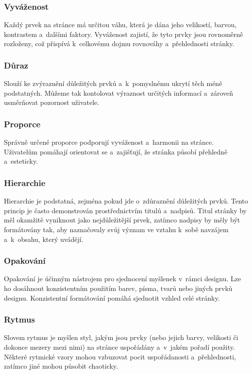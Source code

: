 \subsubsection*{Vyváženost}
Každý prvek na stránce má určitou váhu, která je dána jeho velikostí, barvou, kontrastem a~dalšími faktory. Vyváženost zajistí, že tyto prvky jsou rovnoměrně rozloženy, což přispívá k~celkovému dojmu rovnováhy a~přehlednosti stránky.

\subsubsection*{Důraz}
Slouží ke zvýraznění důležitých prvků a~k~pomyslnému ukrytí těch méně podstatných. Můžeme tak kontolovat výraznost určitých informací a~zároveň usměrňovat pozornost uživatele.

\subsubsection*{Proporce}
Správně určené proporce podporují vyváženost a~harmonii na stránce. Uživatelům pomáhají orientovat se a~zajišťují, že stránka působí přehledně a~esteticky.

\subsubsection*{Hierarchie}
Hierarchie je podstatná, zejména pokud jde o~zdůraznění důležitých prvků. Tento princip je často demonstrován prostřednictvím titulů a~nadpisů. Titul stránky by měl okamžitě vyniknout jako nejdůležitější prvek, zatímco nadpisy by měly být formátovány tak, aby naznačovaly svůj význam ve vztahu k~sobě navzájem a~k~obsahu, který uvádějí.

\subsubsection*{Opakování}
Opakování je účinným nástrojem pro sjednocení myšlenek v~rámci designu. Lze ho dosáhnout konzistentním použitím barev, písma, tvarů nebo jiných prvků designu. Konzistentní formátování pomáhá sjednotit vzhled celé stránky.

\subsubsection*{Rytmus}
Slovem rytmus je myšlen styl, jakým jsou prvky (nebo jejich barvy, velikosti či dokonce mezery mezi nimi) na stránce uspořádány a~v~jakém pořadí použity. Některé rytmické vzory mohou vzbuzovat pocit uspořádanosti a~přehlednosti, zatímco jiné mohou působit chaoticky.

